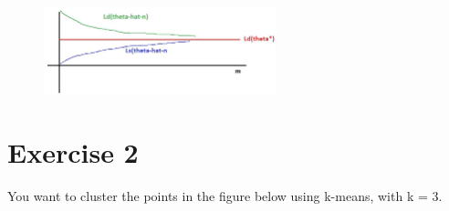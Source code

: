 \documentclass[a4paper,11pt,oneside]{book}
\begin{document}
        \begin{solution}
            \begin{figure}[H]
                \centering
                \includegraphics[width=0.6\textwidth,height=0.4\textheight,keepaspectratio]{images/3_1_1_July_2019.png}
                \end{figure}
        \end{solution}

\section{Exercise 2}
    You want to cluster the points in the figure below using k-means, with k = 3.
\end{document}
